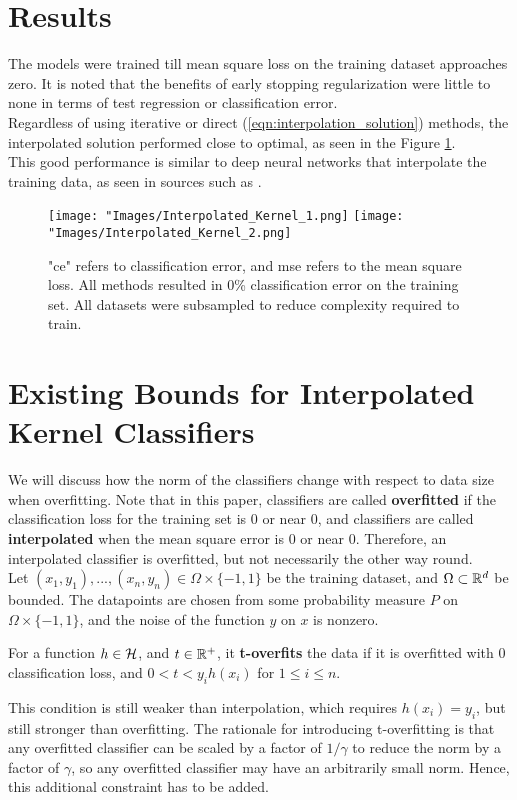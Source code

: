 \documentclass[twoside]{memoir}
\begin{document}
\section{Results}
The models were trained till mean square loss on the training dataset approaches zero. It is noted that the benefits of early stopping regularization were little to none in terms of test regression or classification error.\\
Regardless of using iterative or direct (\ref{eqn:interpolation_solution}) methods, the interpolated solution performed close to optimal, as seen in the Figure \ref{fig:Interpolated_Kernel}.\\
This good performance is similar to deep neural networks that interpolate the training data, as seen in sources such as \cite{Zhang_Deep_Learning}.

\begin{figure}
	\centering
	\texttt{[image: "Images/Interpolated\_Kernel\_1.png]}
	\texttt{[image: "Images/Interpolated\_Kernel\_2.png]}
	\par
	\caption{"ce" refers to classification error, and mse refers to the mean square loss. All methods resulted in 0\% classification error on the training set. All datasets were subsampled to reduce complexity required to train.} \label{fig:Interpolated_Kernel}
\end{figure}

\section{Existing Bounds for Interpolated Kernel Classifiers} \label{sec:BoundsKernel}
We will discuss how the norm of the classifiers change with respect to data size when overfitting. Note that in this paper, classifiers are called \textbf{overfitted} if the classification loss for the training set is 0 or near 0, and classifiers are called \textbf{interpolated} when the mean square error is 0 or near 0. Therefore, an interpolated classifier is overfitted, but not necessarily the other way round.\\
Let $(x_1, y_1),..., (x_n, y_n) \in \Omega \times \{-1, 1\}$ be the training dataset, and $\Omega \subset \mathbb{R}^d$ be bounded. The datapoints are chosen from some probability measure $P$ on $\Omega \times \{-1, 1\}$, and the noise of the function $y$ on $x$ is nonzero.
\begin{defn}
	For a function $h \in \mathcal{H}$, and $t \in \mathbb{R}^+$, it \textbf{t-overfits} the data if it is overfitted with 0 classification loss, and $0 < t< y_ih(x_i)$ for $1\leq i \leq n$.
\end{defn}
This condition is still weaker than interpolation, which requires $h(x_i) = y_i$, but still stronger than overfitting. The rationale for introducing t-overfitting is that any overfitted classifier can be scaled by a factor of $1/\gamma$ to reduce the norm by a factor of $\gamma$, so any overfitted classifier may have an arbitrarily small norm. Hence, this additional constraint has to be added.
\end{document}
